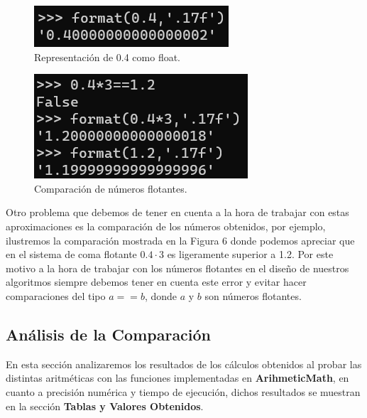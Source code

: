 \documentclass[a4paper,10pt,twocolumn]{article}
\begin{document}
\begin{figure}
	\begin{center}
		\includegraphics[scale=1]{recourses/repre04.png}
		\caption{Representación de 0.4 como float.\label{fig:code}}
	\end{center}
\end{figure}

\begin{figure}
	\begin{center}
		\includegraphics[scale=1]{recourses/comp04mult3.png}
		\caption{Comparación de números flotantes.\label{fig:code}}
	\end{center}
\end{figure}

Otro problema que debemos de tener en cuenta a la hora de trabajar con estas aproximaciones es la comparación de los números obtenidos, por ejemplo, ilustremos la comparación mostrada en la Figura 6 donde podemos apreciar que en el sistema de coma flotante $0.4\cdot 3$ es ligeramente superior a 1.2. Por este motivo a la hora de trabajar con los números flotantes en el diseño de nuestros algoritmos siempre debemos tener en cuenta este error y evitar hacer comparaciones del tipo $a==b$, donde $a$ y $b$ son números flotantes.


\subsection{Análisis de la Comparación}\label{sub:comp}

En esta sección analizaremos los resultados de los cálculos obtenidos al probar las distintas aritméticas con las funciones implementadas en \textbf{ArihmeticMath}, en cuanto a precisión numérica y tiempo de ejecución, dichos resultados se muestran en la sección \textbf{Tablas y Valores Obtenidos}.
\end{document}
